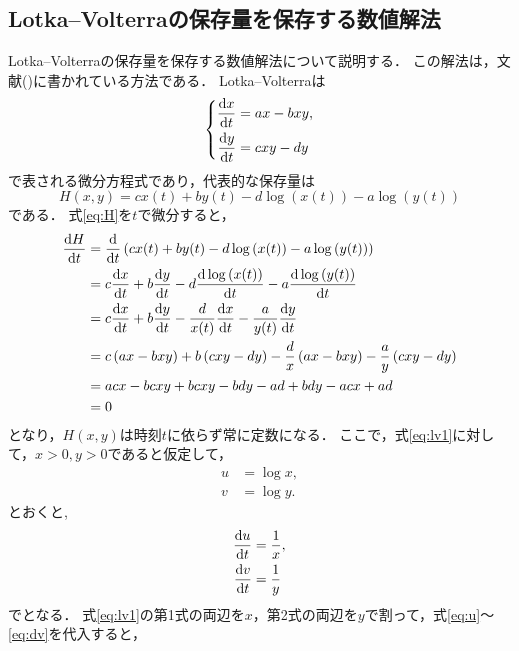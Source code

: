 \subsection{Lotka--Volterraの保存量を保存する数値解法}
Lotka--Volterraの保存量を保存する数値解法について説明する．
この解法は，文献(\cite{BB02105565})に書かれている方法である．
Lotka--Volterraは
\begin{align}
    \left\{
    \begin{aligned}    
        \label{eq:lv1}
        \frac{\mathrm{d}x}{\mathrm{d}t} &= a x - b xy,\\
        \frac{\mathrm{d}y}{\mathrm{d}t} &= c xy - d y
    \end{aligned}
    \right.
\end{align}
で表される微分方程式であり，代表的な保存量は
\begin{equation}
    \label{eq:H}
    H(x,y) = cx(t) + by(t) - d\log\left(x(t)\right) - a\log\left(y(t)\right)
\end{equation}
である．
式\eqref{eq:H}を$t$で微分すると，
\begin{align*}
    \frac{\mathrm{d}H}{\mathrm{d}t} &= \frac{\mathrm{d}}{\mathrm{d}t}\left(cx(t) + by(t) - d\log\left(x(t)\right) - a\log\left(y(t)\right)\right) \\
    &= c\frac{\mathrm{d}x}{\mathrm{d}t} + b\frac{\mathrm{d}y}{\mathrm{d}t} - d\frac{\mathrm{d}\log\left(x(t)\right)}{\mathrm{d}t} - a\frac{\mathrm{d}\log\left(y(t)\right)}{\mathrm{d}t} \\
    &= c\frac{\mathrm{d}x}{\mathrm{d}t} + b\frac{\mathrm{d}y}{\mathrm{d}t} - \frac{d}{x(t)}\frac{\mathrm{d}x}{\mathrm{d}t} - \frac{a}{y(t)}\frac{\mathrm{d}y}{\mathrm{d}t} \\
    &= c\left(ax - bxy\right) + b\left(cxy - dy\right) - \frac{d}{x}\left(ax - bxy\right) - \frac{a}{y}\left(cxy - dy\right) \\
    &= acx - bcxy + bcxy - bdy - ad + bdy - acx + ad \\
    &= 0
\end{align*}
となり，$H(x,y)$は時刻$t$に依らず常に定数になる．
ここで，式\eqref{eq:lv1}に対して，$x > 0,y>0$であると仮定して，
\begin{align}
    \label{eq:u}
    u &= \log x, \\
    \label{eq:v}
    v &= \log y.
\end{align}
とおくと,
\begin{align}
    \label{eq:du}
    \frac{\mathrm{d}u}{\mathrm{d}t} &= \frac{1}{x}, \\
    \label{eq:dv}
    \frac{\mathrm{d}v}{\mathrm{d}t} &= \frac{1}{y}
\end{align}
でとなる．
式\eqref{eq:lv1}の第1式の両辺を$x$，第2式の両辺を$y$で割って，式\eqref{eq:u}〜\eqref{eq:dv}を代入すると，
